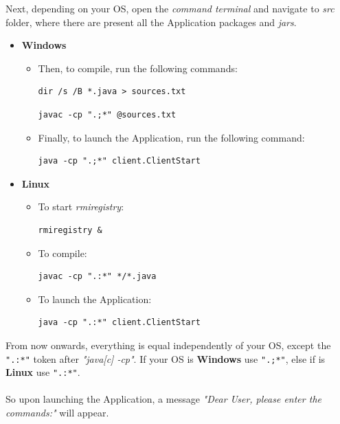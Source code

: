 \documentclass[11pt]{article}
\begin{document}
Next, depending on your OS, open the \textit{command terminal} and navigate to \textit{src} folder, where there are present all the Application packages and \textit{jars}.
\begin{itemize}
\item \textbf{Windows}
\begin{itemize}
Because of our communication protocol being done in \textit{RMI (Remote Method Invocation)}, firstly you have to start \textit{rmiregistry}. This can be made like this:
\begin{lstlisting}
start rmiregistry
\end{lstlisting}
\item Then, to compile, run the following commands: 
\begin{lstlisting}
dir /s /B *.java > sources.txt
\end{lstlisting}
\begin{lstlisting}
javac -cp ".;*" @sources.txt
\end{lstlisting}
\item Finally, to launch the Application, run the following command:
\begin{lstlisting}
java -cp ".;*" client.ClientStart
\end{lstlisting}
\end{itemize}
\item \textbf{Linux}
\begin{itemize}
\item To start \textit{rmiregistry}:
\begin{lstlisting}
rmiregistry &
\end{lstlisting}
\item To compile: 
\begin{lstlisting}
javac -cp ".:*" */*.java
\end{lstlisting}
\item To launch the Application:
\begin{lstlisting}
java -cp ".:*" client.ClientStart
\end{lstlisting}
\end{itemize}
\end{itemize}
From now onwards, everything is equal independently of your OS, except the \verb|".:*"| token after \textit{"java[c] -cp"}. If your OS is \textbf{Windows} use \verb|".;*"|, else if is \textbf{Linux} use \verb|".:*"|.\\
\\
So upon launching the Application, a message \textit{"Dear User, please enter the commands:"} will appear.\\
\end{document}
